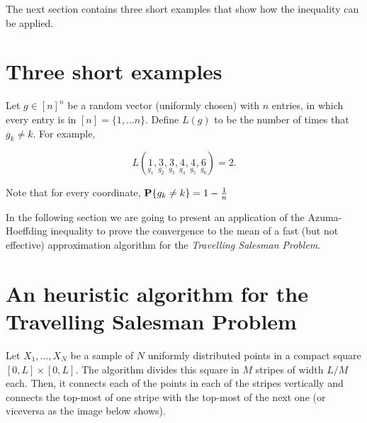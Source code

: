The next section contains three short examples that show how the inequality can be applied.

\section{Three short examples}

Let $g \in {[n]}^{n}$ be a random vector (uniformly chosen) with $n$ entries, in which every entry is in $[n] = \{1,\ldots n\}$. Define $L(g)$ to be the number of times that $g_k \neq k$. For example,

\[ L(\underset{g_1}{1},\underset{g_2}{3},\underset{g_3}{3},\underset{g_4}{4},\underset{g_5}{4},\underset{g_6}{6}) = 2. \]

Note that for every coordinate, $\P\{g_k \neq k\} = 1-\tfrac{1}{n}$




\vspace*{3em}

In the following section we are going to present an application of the Azuma-Hoeffding inequality to prove the convergence to the mean of a fast (but not effective) approximation algorithm for the \textit{Travelling Salesman Problem}. 

\section{An heuristic algorithm for the Travelling Salesman Problem}

Let $X_1,\ldots, X_N$ be a sample of $N$ uniformly distributed points in a compact square $[0,L]\times [0,L]$. The algorithm divides this square in $M$ stripes of width $L/M$ each. Then, it connects each of the points in each of the stripes vertically and connects the top-most of one stripe with the top-most of the next one (or viceversa as the image below shows).

